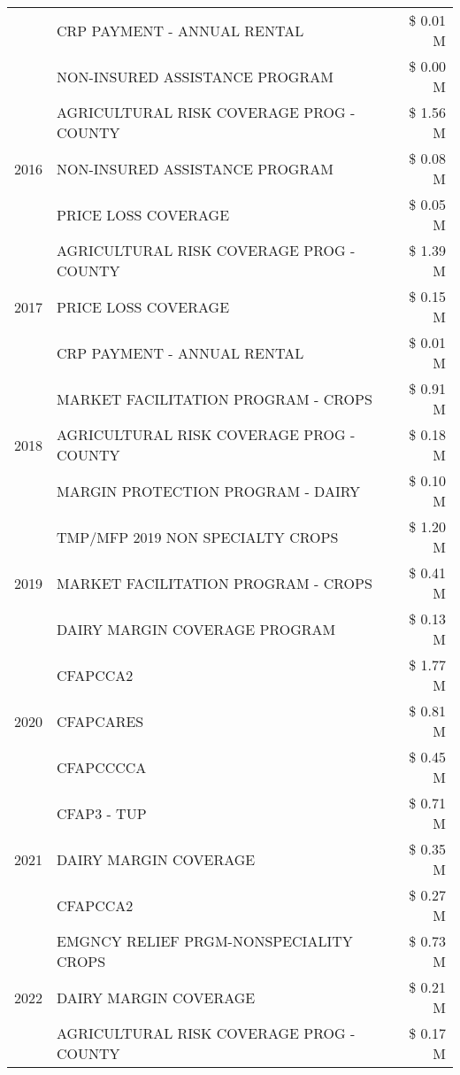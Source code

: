 \begin{tabular}{llr}
 & CRP PAYMENT - ANNUAL RENTAL & \$ 0.01 M \\
 & NON-INSURED ASSISTANCE PROGRAM & \$ 0.00 M \\
\cline{1-3}
\multirow[t]{3}{*}{2016} & AGRICULTURAL RISK COVERAGE PROG - COUNTY & \$ 1.56 M \\
 & NON-INSURED ASSISTANCE PROGRAM & \$ 0.08 M \\
 & PRICE LOSS COVERAGE & \$ 0.05 M \\
\cline{1-3}
\multirow[t]{3}{*}{2017} & AGRICULTURAL RISK COVERAGE PROG - COUNTY & \$ 1.39 M \\
 & PRICE LOSS COVERAGE & \$ 0.15 M \\
 & CRP PAYMENT - ANNUAL RENTAL & \$ 0.01 M \\
\cline{1-3}
\multirow[t]{3}{*}{2018} & MARKET FACILITATION PROGRAM - CROPS & \$ 0.91 M \\
 & AGRICULTURAL RISK COVERAGE PROG - COUNTY & \$ 0.18 M \\
 & MARGIN PROTECTION PROGRAM - DAIRY & \$ 0.10 M \\
\cline{1-3}
\multirow[t]{3}{*}{2019} & TMP/MFP 2019 NON SPECIALTY CROPS & \$ 1.20 M \\
 & MARKET FACILITATION PROGRAM - CROPS & \$ 0.41 M \\
 & DAIRY MARGIN COVERAGE PROGRAM & \$ 0.13 M \\
\cline{1-3}
\multirow[t]{3}{*}{2020} & CFAPCCA2 & \$ 1.77 M \\
 & CFAPCARES & \$ 0.81 M \\
 & CFAPCCCCA & \$ 0.45 M \\
\cline{1-3}
\multirow[t]{3}{*}{2021} & CFAP3 - TUP & \$ 0.71 M \\
 & DAIRY MARGIN COVERAGE & \$ 0.35 M \\
 & CFAPCCA2 & \$ 0.27 M \\
\cline{1-3}
\multirow[t]{3}{*}{2022} & EMGNCY RELIEF PRGM-NONSPECIALITY CROPS & \$ 0.73 M \\
 & DAIRY MARGIN COVERAGE & \$ 0.21 M \\
 & AGRICULTURAL RISK COVERAGE PROG - COUNTY & \$ 0.17 M \\
\cline{1-3}
\bottomrule
\end{tabular}
